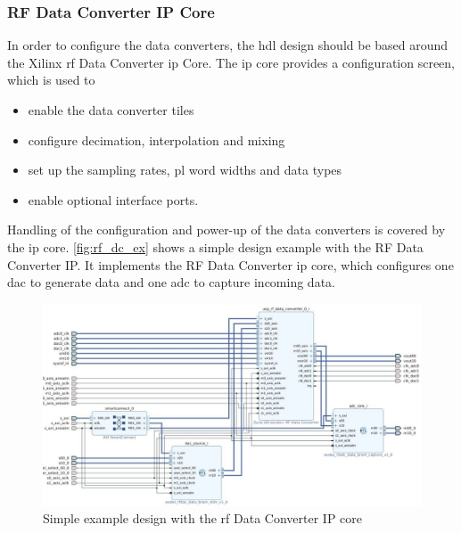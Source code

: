 \subsubsection*{RF Data Converter IP Core}
In order to configure the data converters, the \gls{hdl} design should be based around the Xilinx \gls{rf} Data Converter \gls{ip} Core. 
The \gls{ip} core provides a configuration screen, which is used to 
\begin{itemize}
	\item enable the data converter tiles
	\item configure decimation, interpolation and mixing 
	\item set up the sampling rates, \gls{pl} word widths and data types
	\item enable optional interface ports.
\end{itemize}
Handling of the configuration and power-up of the data converters is covered by the \gls{ip} core. 
\autoref{fig:rf_dc_ex} shows a simple design example with the RF Data Converter IP. It implements the RF Data Converter \gls{ip} core, which configures one \gls{dac} to generate data and one \gls{adc} to capture incoming data.
\begin{figure}[tb]
	\centering
	\includegraphics[width = \textwidth]{chap/05-readout/img/rf_data_converter}
	\caption{Simple example design with the \gls{rf} Data Converter IP core}
	\label{fig:rf_dc_ex}
\end{figure}

